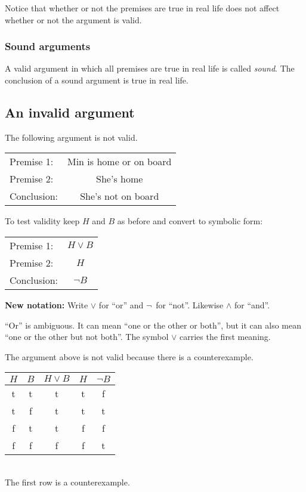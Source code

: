 \documentclass[letterpaper, 11pt]{article}
\theoremstyle{definition}
\begin{document}
Notice that whether or not the premises are true in real life does not affect whether or not the argument is valid. 

\subsubsection{Sound arguments}

A valid argument in which all premises are true in real life is called {\em sound}. The conclusion of a sound argument is true in real life. 

\subsection{An invalid argument}

The following argument is not valid.

\begin{center}
\begin{tabular}{lc}
Premise 1:	& Min is home or on board\\
Premise 2:	& She's home\\ \hline
\rule{0pt}{12pt}Conclusion:	& She's not on board
\end{tabular}
\end{center}

To test validity keep $H$ and $B$ as before and convert to symbolic form:

\begin{center}
\begin{tabular}{lc}
Premise 1:	& $H \vee B$\\
Premise 2:	& $H$\\ \hline
\rule{0pt}{12pt}Conclusion:	& $\neg B$
\end{tabular}
\end{center}

{\bf New notation:} Write $\vee$ for ``or'' and $\neg$\, for ``not''. Likewise $\wedge$ for ``and''.

``Or'' is ambiguous. It can mean ``one or the other or both'', but it can also mean ``one or the other but not both''.  The symbol $\vee$ carries the first meaning. 

The argument above is not valid because there is a counterexample.

\begin{center}
\begin{tabular}{cc|ccc}
 $H$ & $B$ & $H\vee B$ & $H$ & $\neg B$ \\\hline
 t & t &  t  & t & f\\
 t & f &  t  & t & t\\
 f & t &  t  & f & f\\
 f & f &  f  & f & t
\end{tabular}\\
The first row is a counterexample.
\end{center}
\end{document}
